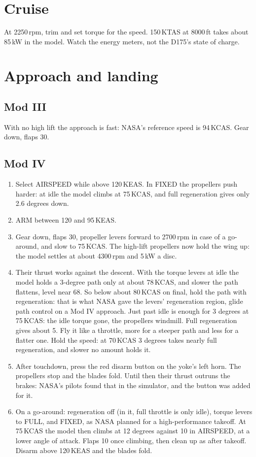 \documentclass[11pt,a4paper,oneside]{book}
\newcommand{\ann}[1]{\textsf{\small #1}}
\begin{document}
\section{Cruise}
At 2250\,rpm, trim and set torque for the speed. 150\,KTAS at 8000\,ft takes about 85\,kW in the model. Watch the energy meters, not the D175's state of charge.

\section{Approach and landing}
\subsection{Mod III}
With no high lift the approach is fast: NASA's reference speed is 94\,KCAS. Gear down, flaps 30.
\subsection{Mod IV}
\begin{enumerate}
\item Select \ann{AIRSPEED} while above 120\,KEAS. In \ann{FIXED} the propellers push harder: at idle the model climbs at 75\,KCAS, and full regeneration gives only 2.6 degrees down.
\item \ann{ARM} between 120 and 95\,KEAS.
\item Gear down, flaps 30, propeller levers forward to 2700\,rpm in case of a go-around, and slow to 75\,KCAS. The high-lift propellers now hold the wing up: the model settles at about 4300\,rpm and 5\,kW a disc.
\item Their thrust works against the descent. With the torque levers at idle the model holds a 3-degree path only at about 78\,KCAS, and slower the path flattens, level near 68. So below about 80\,KCAS on final, hold the path with regeneration: that is what NASA gave the levers' regeneration region, glide path control on a Mod IV approach. Just past idle is enough for 3 degrees at 75\,KCAS: the idle torque gone, the propellers windmill. Full regeneration gives about 5. Fly it like a throttle, more for a steeper path and less for a flatter one. Hold the speed: at 70\,KCAS 3 degrees takes nearly full regeneration, and slower no amount holds it.
\item After touchdown, press the red disarm button on the yoke's left horn. The propellers stop and the blades fold. Until then their thrust outruns the brakes: NASA's pilots found that in the simulator, and the button was added for it.
\item On a go-around: regeneration off (in it, full throttle is only idle), torque levers to \ann{FULL}, and \ann{FIXED}, as NASA planned for a high-performance takeoff. At 75\,KCAS the model then climbs at 12 degrees against 10 in \ann{AIRSPEED}, at a lower angle of attack. Flaps 10 once climbing, then clean up as after takeoff. Disarm above 120\,KEAS and the blades fold.
\end{enumerate}
\end{document}
